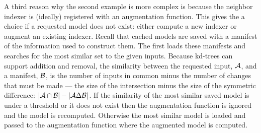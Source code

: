         A third reason why the second example is more complex is because the
          neighbor indexer is (ideally) registered with an augmentation
          function.
        This gives the \depcache{} a choice if a requested model does not
          exist:
        either compute a new indexer or augment an existing indexer.
        Recall that cached models are saved with a manifest of the information
          used to construct them.
        The \depcache{} first loads these manifests and searches for the most
          similar set to the given inputs.
        Because kd-trees can support addition and removal, the similarity
          between the requested input, $\mathcal{A}$, and a manifest, $\mathcal{B}$, is
          the number of inputs in common minus the number of changes that must
          be made --- \ie{} the size of the intersection minus the size of the
          symmetric difference:
        $|\mathcal{A} \cap \mathcal{B}| - |\mathcal{A} \Delta \mathcal{B}|$.
        If the similarity of the most similar saved model is under a threshold
          or it does not exist then the augmentation function is ignored and the
          model is recomputed.
        Otherwise the most similar model is loaded and passed to the
          augmentation function where the augmented model is computed.



